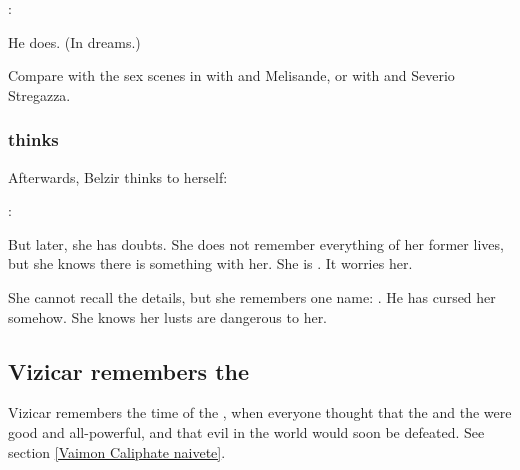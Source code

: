 \begin{prose}
  \Belzir: 
\end{prose}

He does. (In dreams.)

Compare with the sex scenes in  with \Phedre{} and Melisande, or with \Phedre{} and Severio Stregazza. 






\subsubsection{\Belzir{} thinks}
Afterwards, Belzir thinks to herself: 

\begin{prose}
  \Belzir:
\end{prose}

But later, she has doubts. 
She does not remember everything of her former lives, but she knows there is something  with her. 
She is . 
It worries her. 

She cannot recall the details, but she remembers one name: 
\Nexagglachel. 
He has cursed her somehow. 
She knows her lusts are dangerous to her. 











\subsection{Vizicar remembers the \angels}
Vizicar remembers the time of the \VaimonCaliphate, when everyone thought that the \Sephiroth{} and the \angels{} were good and all-powerful, and that evil in the world would soon be defeated. See section \ref{Vaimon Caliphate naivete}.

